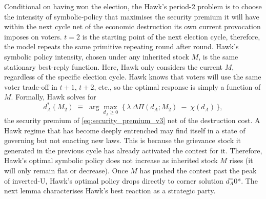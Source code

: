 \documentclass[11pt,twoside]{extarticle}
\begin{document}
Conditional on having won the election, the Hawk's period-2 problem is to choose the intensity of symbolic-policy that maximises the security premium it will have within the next cycle net of the economic destruction its own current provocation imposes on voters.
$t=2$ is the starting point of the next election cycle, therefore, the model repeats the same primitive repeating round after round. Hawk's symbolic policy intensity, chosen under any inherited stock $M$, is the same stationary best-reply function. Here, Hawk only considers the current $M$, regardless of the specific election cycle. Hawk knows that voters will use the same voter trade-off in $t+1$, $t+2$, etc., so the optimal response is simply a function of $M$. Formally, Hawk solves for
\begin{equation}\label{eq:hawk_t2_objective_v3}
    d_A^*(M_2)\;\equiv\;\arg\max_{d_A\ge 0}\;\big\{\,\lambda\,\Delta\Pi(d_A;M_2)\;-\;\chi(d_A)\,\big\},
\end{equation}
the security premium of \eqref{eq:security_premium_v3} net of the destruction cost.
A Hawk regime that has become deeply entrenched may find itself in a state of governing but not enacting new laws. This is because the grievance stock it generated in the previous cycle has already activated the contest for it.
Therefore, Hawk's optimal symbolic policy does not increase as inherited stock $M$ rises (it will only remain flat or decrease). 
Once $M$ has pushed the contest past the peak of inverted-U, Hawk's optimal policy drops directly to corner solution $d_A^ = 0$*.
The next lemma characterises Hawk's best reaction as a strategic party.
\end{document}
